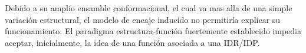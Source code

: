 Debido a su amplio ensamble conformacional, el cual va mas alla de una simple variación estructural, el modelo de encaje inducido no permitiría explicar su funcionamiento.
El paradigma estructura-función fuertemente establecido impedia aceptar, inicialmente, la idea de una función asociada a una IDR/IDP. 

